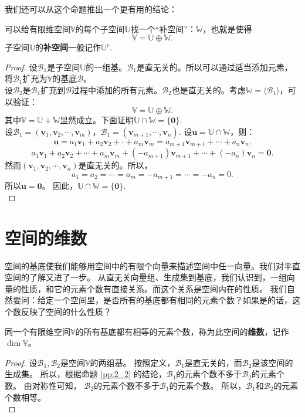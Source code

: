 \documentclass[12pt,UTF8]{ctexbook}
\begin{document}
我们还可以从这个命题推出一个更有用的结论：
\begin{pp}\label{pp:2_8}
    可以给有限维空间$\mathbb{V}$的每个子空间$\mathbb{U}$找一个“补空间”：$\mathbb{W}$，也就是使得
    $$ \mathbb{V} = \mathbb{U} \oplus \mathbb{W}.$$
    子空间$\mathbb{U}$的\textbf{补空间}一般记作$\mathbb{U}^c.$
\end{pp}
\begin{proof} %
    设$\mathcal{B}_1$是子空间$\mathbb{U}$的一组基。$\mathcal{B}_1$是直无关的。所以可以通过适当添加元素，将$\mathcal{B}_1$扩充为$\mathbb{V}$的基底$\mathcal{B}$。\\
    设$\mathcal{B}_2$是$\mathcal{B}_1$扩充到$\mathcal{B}$过程中添加的所有元素。$\mathcal{B}_2$也是直无关的。考虑$\mathbb{W} = \langle\mathcal{B}_1\rangle$，可以验证：
    $$ \mathbb{V} = \mathbb{U} \oplus \mathbb{W}.$$
    其中$ \mathbb{V} = \mathbb{U} + \mathbb{W}$显然成立。下面证明$ \mathbb{U} \cap \mathbb{W} = \{\mathbf{0}\}$.\\
    设$\mathcal{B}_1 = (\mathbf{v}_1, \mathbf{v}_2, \cdots , \mathbf{v}_m )$，$\mathcal{B}_1 = (\mathbf{v}_{m+1}, \cdots , \mathbf{v}_n )$. 设$ \mathbf{u} = \mathbb{U} \cap \mathbb{W}$，则：
    $$ \mathbf{u} = a_1\mathbf{v}_1 + a_2\mathbf{v}_2 + \cdot + a_m\mathbf{v}_m = a_{m+1}\mathbf{v}_{m+1} + \cdots + a_n\mathbf{v}_n. $$
    $$a_1\mathbf{v}_1 + a_2\mathbf{v}_2 + \cdots + a_m\mathbf{v}_m + (-a_{m+1})\mathbf{v}_{m+1} + \cdots + (-a_{n})\mathbf{v}_{n} = \mathbf{0}. $$
    然而$(\mathbf{v}_1, \mathbf{v}_2, \cdots , \mathbf{v}_n )$是直无关的。所以，
    $$ a_1 = a_2 = \cdots = a_m = -a_{m+1} = \cdots = -a_n = 0.$$
    所以$\mathbf{u} = \mathbf{0}$。
    因此，$ \mathbb{U} \cap \mathbb{W} = \{\mathbf{0}\}$.\\
\end{proof}


\section{空间的维数}
空间的基底使我们能够用空间中的有限个向量来描述空间中任一向量。我们对平直空间的了解又进了一步。
从直无关向量组、生成集到基底，我们认识到，一组向量的性质，和它的元素个数有直接关系。而这个关系是空间内在的性质。
我们自然要问：给定一个空间里，是否所有的基底都有相同的元素个数？如果是的话，这个数反映了空间的什么性质？

\begin{pp}\label{pp:2_9}
    同一个有限维空间$\mathbb{V}$的所有基底都有相等的元素个数，称为此空间的{\bfseries 维数}，记作$\dim\mathbb{V}$。
\end{pp}
\begin{proof} %
    设$\mathcal{B}_1, \mathcal{B}_2$是空间$\mathbb{V}$的两组基。
    按照定义，$\mathcal{B}_1$是直无关的，而$\mathcal{B}_2$是该空间的生成集。
    所以，根据命题 \ref{pp:2_2} 的结论，$\mathcal{B}_1$的元素个数不多于$\mathcal{B}_2$的元素个数。
    由对称性可知， $\mathcal{B}_2$的元素个数不多于$\mathcal{B}_1$的元素个数。
    所以，$\mathcal{B}_1$和$\mathcal{B}_2$的元素个数相等。\\
\end{proof}
\end{document}
